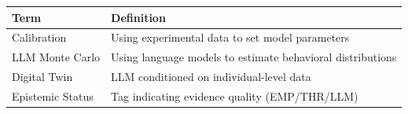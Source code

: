 
%
%
%
%
%

\begin{tcolorbox}[
    colback=gray!5!white,
    colframe=gray!75!black,
    title={\textbf{Begriffe in diesem Kapitel}},
    fonttitle=\bfseries
]
\small
\begin{tabular}{@{}lp{8cm}@{}}
\textbf{Term} & \textbf{Definition} \\
\midrule
Calibration & Using experimental data to set model parameters \\
LLM Monte Carlo & Using language models to estimate behavioral distributions \\
Digital Twin & LLM conditioned on individual-level data \\
Epistemic Status & Tag indicating evidence quality (EMP/THR/LLM) \\
\end{tabular}
\end{tcolorbox}

